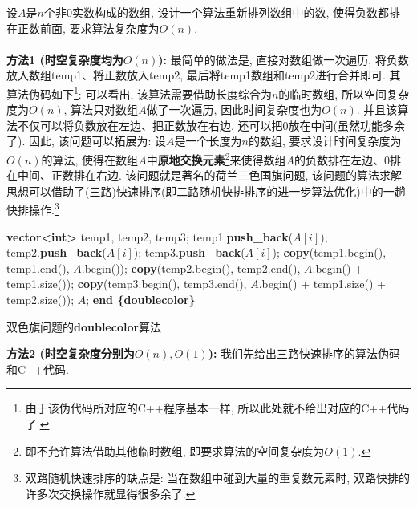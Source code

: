 \documentclass{article}
\begin{document}
\begin{homeworkProblem}
	设$A$是$n$个非0实数构成的数组, 设计一个算法重新排列数组中的数, 使得负数都排在正数前面, 要求算法复杂度为$O(n)$.
	\\

	\solution
	\\

	\textbf{方法1 (时空复杂度均为$O(n)$):} 最简单的做法是, 直接对数组做一次遍历, 将负数放入数组temp1、将正数放入temp2, 最后将temp1数组和temp2进行合并即可. 其算法伪码如下\footnote{由于该伪代码所对应的C++程序基本一样, 所以此处就不给出对应的C++代码了.}: 可以看出, 该算法需要借助长度综合为$n$的临时数组, 所以空间复杂度为$O(n)$, 算法只对数组$A$做了一次遍历, 因此时间复杂度也为$O(n)$. 并且该算法不仅可以将负数放在左边、把正数放在右边, 还可以把0放在中间(虽然功能多余了). 因此, 该问题可以拓展为: 设$A$是一个长度为$n$的数组, 要求设计时间复杂度为$O(n)$的算法, 使得在数组$A$中\textbf{原地交换元素}\footnote{即不允许算法借助其他临时数组, 即要求算法的空间复杂度为$O(1)$.}来使得数组$A$的负数排在左边、0排在中间、正数排在右边. 该问题就是著名的荷兰三色国旗问题, 该问题的算法求解思想可以借助了(三路)快速排序(即二路随机快排排序的进一步算法优化)中的一趟快排操作.\footnote{双路随机快速排序的缺点是: 当在数组中碰到大量的重复数元素时, 双路快排的许多次交换操作就显得很多余了.}
	\newpage
	\begin{algorithm}[H]
		\begin{algorithmic}[1]
		\State \textbf{vector<int>} temp1, temp2, temp3;
				\State temp1.\textbf{push_back}($A[i]$);
				\State temp2.\textbf{push_back}($A[i]$);
			\Else
				\State temp3.\textbf{push_back}($A[i]$);
			\EndIf
		\EndFor
		\State \textbf{copy}(temp1.begin(), temp1.end(), $A$.begin());
		\State \textbf{copy}(temp2.begin(), temp2.end(), $A$.begin() + temp1.size());
		\State \textbf{copy}(temp3.begin(), temp3.end(), $A$.begin() + temp1.size() + temp2.size());
		\State \Return $A$;
		\State \textbf{end \{doublecolor\}}
		\end{algorithmic}
		\caption{双色旗问题的\textbf{doublecolor}算法}
		\label{alg:简单算法}
	\end{algorithm}
	\textbf{方法2 (时空复杂度分别为$O(n),O(1)$):} 我们先给出三路快速排序的算法伪码和C++代码.
	\begin{algorithm}[H]
		\begin{algorithmic}[1]

\end{algorithmic}
\end{algorithm}
\end{homeworkProblem}
\end{document}
